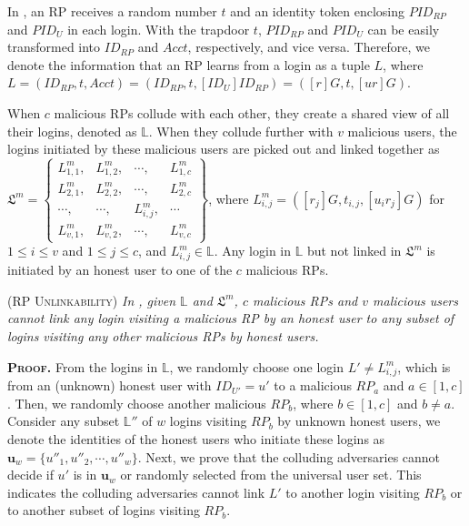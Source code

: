 In \usso, an RP receives a random number $t$ and an identity token enclosing $PID_{RP}$ and $PID_U$ in each login. %
With the trapdoor $t$, $PID_{RP}$ and $PID_U$ can be easily transformed into $ID_{RP}$ and $Acct$, respectively, and vice versa. Therefore, we denote the information that an RP learns from a login as a tuple $L$, where $L =(ID_{RP}, t, Acct)=(ID_{RP}, t, [ID_{U}]ID_{RP})=([r]G, t, [ur]G)$.



When $c$ malicious RPs collude with each other, they create a shared view of all their logins, denoted as $\mathbb{L}$.
When they collude further with $v$ malicious users, the logins initiated by these malicious users are picked out and linked together as
$\mathfrak{L}^m=\left \{ \begin{matrix}
L^m_{1,1},&L^m_{1,2},&\cdots,&L^m_{1,c}\\
L^m_{2,1},& L^m_{2,2},&\cdots,&L^m_{2,c}\\
\cdots,&\cdots,&L^m_{i,j},&\cdots\\
L^m_{v,1},&L^m_{v,2},&\cdots,&L^m_{v,c}
\end{matrix}\right\}$,
where $L^m_{i, j}=([r_j]G, t_{i,j}, [u_ir_j]G)$ for $1 \le i \le v$ and $1 \le j \le c$, and $L^m_{i,j} \in \mathbb{L}$. Any login in $\mathbb{L}$ but not linked in $\mathfrak{L}^m$ is initiated by an honest user to one of the $c$ malicious RPs.


\begin{thm}
\textsc{(RP Unlinkability)} \emph{In \usso, given $\mathbb{L}$ and $\mathfrak{L}^m$, $c$ malicious RPs and $v$ malicious users cannot link any login visiting a malicious RP by an honest user to any subset of logins visiting any other malicious RPs by honest users.}
\end{thm}


\noindent\textbf{\textsc{Proof.}} From the logins in $\mathbb{L}$,
 we randomly choose one login $L' \neq L^m_{i,j}$,
 which is from an (unknown) honest user with $ID_{U'}=u'$ to a malicious $RP_a$ and $a \in [1,c]$.
Then, we randomly choose another malicious $RP_b$, where $b \in [1,c]$ and $b \neq a$.
Consider any subset $\mathbb{L}''$ of $w$ logins visiting $RP_b$ by unknown honest users,
 we denote the identities of the honest users who initiate these logins as $\mathbf{u}_w=\{{u''_1}, {u''_2}, \cdots, {u''_w}\}$.
Next, we prove that the colluding adversaries cannot decide if $u'$ is in $\mathbf{u}_w$ or randomly selected from the universal user set.
This indicates the colluding adversaries cannot link $L'$ to another login visiting $RP_b$
    or to another subset of logins visiting $RP_b$.


